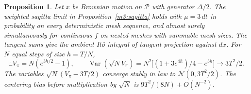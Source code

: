 \documentclass[11pt,reqno]{amsart}
\newtheorem{proposition}[theorem]{Proposition}
\theoremstyle{definition}
\theoremstyle{remark}
\numberwithin{equation}{section}
\begin{document}
\begin{proposition}\label{m3:brownian}
Let \(x\) be Brownian motion on \(\mathcal P\) with generator \(\Delta/2\).
The weighted sagitta limit in Proposition~\ref{m3:sagitta} holds
with \(\mu=3\,dt\) in probability on every deterministic mesh
sequence, and almost surely simultaneously for continuous \(f\)
on nested meshes with summable mesh sizes. The tangent sums give
the ambient It\^o integral of tangent projection against \(dx\).
For \(N\) equal steps of size \(h=T/N\),
\[
 \mathbb E V_\pi=N(e^{3h/2}-1),\qquad
 \operatorname{Var}(\sqrt N V_\pi)
 =N^2\bigl[(1+3e^{4h})/4-e^{3h}\bigr]\longrightarrow 3T^2/2 .
\]
The variables \(\sqrt N(V_\pi-3T/2)\) converge stably in law to
\(\mathcal N(0,3T^2/2)\). The centering bias before multiplication
by \(\sqrt N\) is \(9T^2/(8N)+O(N^{-2})\).
\end{proposition}
\end{document}
